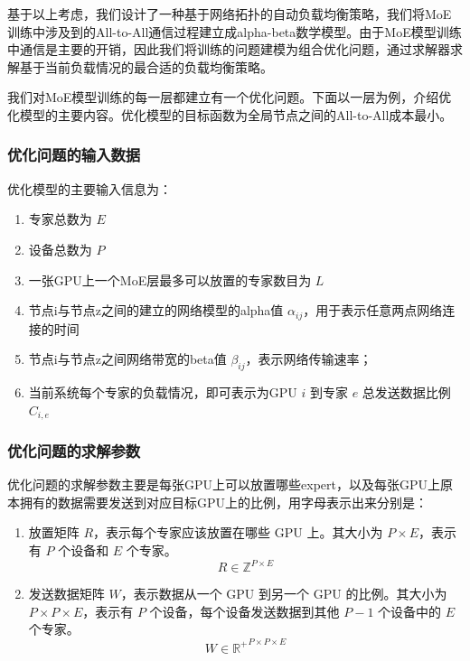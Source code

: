 基于以上考虑，我们设计了一种基于网络拓扑的自动负载均衡策略，我们将MoE训练中涉及到的All-to-All通信过程建立成alpha-beta数学模型。由于MoE模型训练中通信是主要的开销，因此我们将训练的问题建模为组合优化问题，通过求解器求解基于当前负载情况的最合适的负载均衡策略。

我们对MoE模型训练的每一层都建立有一个优化问题。下面以一层为例，介绍优化模型的主要内容。优化模型的目标函数为全局节点之间的All-to-All成本最小。

\subsubsection{优化问题的输入数据}

优化模型的主要输入信息为：

\begin{enumerate}
    \item 专家总数为 $E$

    \item 设备总数为 $P$
    
    \item 一张GPU上一个MoE层最多可以放置的专家数目为 $L$
    
    \item 节点i与节点z之间的建立的网络模型的alpha值 $\alpha_{ij}$，用于表示任意两点网络连接的时间
    
    \item 节点i与节点z之间网络带宽的beta值 $\beta_{ij}$，表示网络传输速率；
    
    \item 当前系统每个专家的负载情况，即可表示为GPU $i$ 到专家 $e$ 总发送数据比例$C_{i,e}$
\end{enumerate}

\subsubsection{优化问题的求解参数}

优化问题的求解参数主要是每张GPU上可以放置哪些expert，以及每张GPU上原本拥有的数据需要发送到对应目标GPU上的比例，用字母表示出来分别是：
\begin{enumerate}
    \item 放置矩阵 $R$，表示每个专家应该放置在哪些 GPU 上。其大小为 $P \times E$，表示有 $P$ 个设备和 $E$ 个专家。
    $$R \in \mathbb{Z}^{P \times E}$$

    \item 发送数据矩阵 $W$，表示数据从一个 GPU 到另一个 GPU 的比例。其大小为 $P \times P \times E$，表示有 $P$ 个设备，每个设备发送数据到其他 $P-1$ 个设备中的 $E$ 个专家。
    $$W \in \mathbb{R^{+}}^{P \times P \times E}$$
\end{enumerate}

